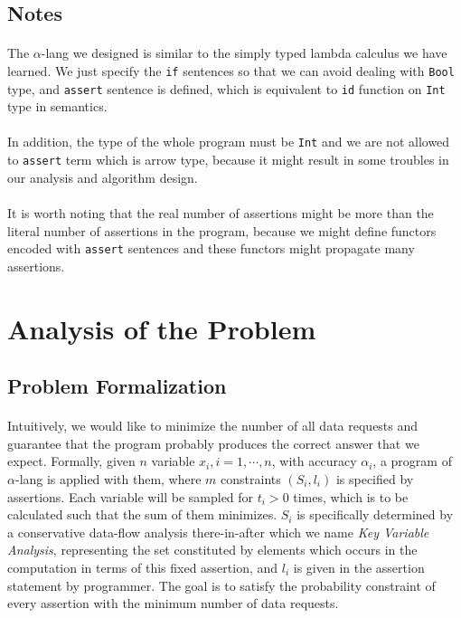 \documentclass[a4paper]{article}
\begin{document}
\subsection{Notes}
\paragraph{}
The $\alpha$-lang we designed is similar to the simply typed lambda calculus we have learned. We just specify the \texttt{if} sentences so that we can avoid dealing with \texttt{Bool} type, and \texttt{assert} sentence is defined, which is equivalent to \texttt{id} function on \texttt{Int} type in semantics.
\paragraph{}
In addition, the type of the whole program must be \texttt{Int} and we are not allowed to \texttt{assert} term which is arrow type, because it might result in some troubles in our analysis and algorithm design.
\paragraph{}
It is worth noting that the real number of assertions might be more than the literal number of assertions in the program, because we might define functors encoded with \texttt{assert} sentences and these functors might propagate many assertions.
\section{Analysis of the Problem}
\subsection{Problem Formalization}
\paragraph{}
Intuitively, we would like to minimize the number of all data requests and guarantee that the program probably produces the correct answer that we expect. Formally, given $n$ variable $x_i,i=1,\cdots,n$, with accuracy $\alpha_i$, a program of $\alpha$-lang is applied with them, where $m$ constraints $(S_i,l_i)$ is specified by assertions. Each variable will be sampled for $t_i>0$ times, which is to be calculated such that the sum of them minimizes. $S_i$ is specifically determined by a conservative data-flow analysis there-in-after which we name \emph{Key Variable Analysis}, representing the set constituted by elements which occurs in the computation in terms of this fixed assertion, and $l_i$ is given in the assertion statement by programmer. The goal is to satisfy the probability constraint of every assertion with the minimum number of data requests.
\end{document}
